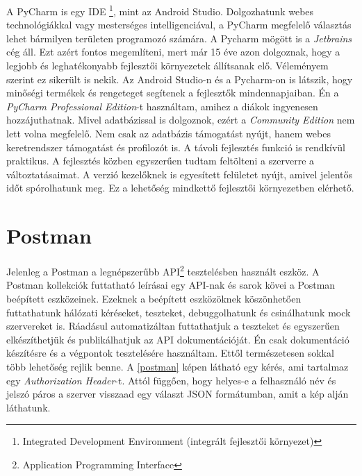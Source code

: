 \documentclass{thesis-ekf}
\theoremstyle{definition}
\theoremstyle{remark}
\begin{document}
A PyCharm is egy IDE \footnote{Integrated Development Environment (integrált fejlesztői környezet)}, mint az Android Studio.
Dolgozhatunk webes technológiákkal vagy mesterséges intelligenciával, a PyCharm megfelelő választás lehet bármilyen területen programozó számára.
A Pycharm mögött is a \emph{Jetbrains} cég áll. Ezt azért fontos megemlíteni, mert már 15 éve azon dolgoznak, hogy a legjobb és leghatékonyabb fejlesztői környezetek állítsanak elő.
Véleményem szerint ez sikerült is nekik. Az Android Studio-n és a Pycharm-on  is látszik, hogy minőségi termékek és rengeteget segítenek a fejlesztők mindennapjaiban.
Én a \emph{PyCharm Professional Edition}-t használtam, amihez a diákok ingyenesen hozzájuthatnak.
Mivel adatbázissal is dolgoznok, ezért a \emph{Community Edition} nem lett volna megfelelő.
Nem csak az adatbázis támogatást nyújt, hanem webes keretrendszer támogatást és profilozót is.
A távoli fejlesztés funkció is rendkívül praktikus. A fejlesztés közben egyszerűen tudtam feltölteni a szerverre a változtatásaimat.
A verzió kezelőknek is egyesített felületet nyújt, amivel jelentős időt spórolhatunk meg.
Ez a lehetőség mindkettő fejlesztői környezetben elérhető.\cite{pycharm}


\section{Postman}

Jelenleg a Postman a legnépszerűbb API\footnote{Application Programming Interface} tesztelésben használt eszköz.
A Postman kollekciók futtatható leírásai egy API-nak és sarok kövei a Postman beépített eszközeinek.
Ezeknek a beépített eszközöknek köszönhetően futtathatunk hálózati kéréseket, teszteket, debuggolhatunk és csinálhatunk mock szervereket is.
Ráadásul automatizáltan futtathatjuk a teszteket és egyszerűen elkészíthetjük és publikálhatjuk az API dokumentációját.
Én csak dokumentáció készítésre és a végpontok tesztelésére használtam. Ettől természetesen sokkal több lehetőség rejlik benne.
A \ref{postman} képen látható egy kérés, ami tartalmaz egy \emph{Authorization Header}-t.
Attól függően, hogy helyes-e a felhasználó név és jelszó páros a szerver visszaad egy választ JSON formátumban, amit a kép alján láthatunk.
\end{document}
